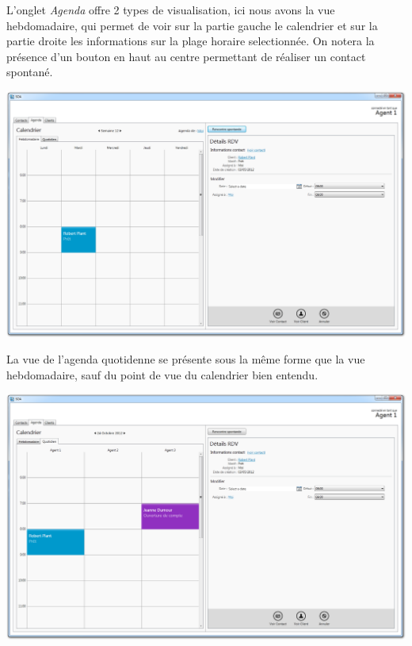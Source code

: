 L'onglet \textit{Agenda} offre 2 types de visualisation, ici nous avons la vue hebdomadaire, qui permet de voir sur la partie gauche le calendrier et sur la partie droite les informations sur la plage horaire selectionnée.
On notera la présence d'un bouton en haut au centre permettant de réaliser un contact spontané.
\medskip
\begin {center}
\includegraphics[width=\textwidth]{../../ihm/pngIHM/CalendrierHebdomadaire.png}
\end {center}
\medskip



La vue de l'agenda quotidenne se présente sous la même forme que la vue hebdomadaire, sauf du point de vue du calendrier bien entendu.
\medskip
\begin {center}
\includegraphics[width=\textwidth]{../../ihm/pngIHM/CalendrierQuotidien.png}
\end {center}
\medskip


